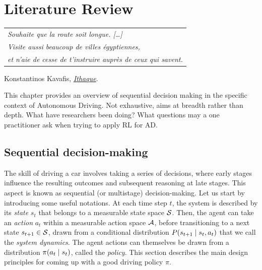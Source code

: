 
\graphicspath{{2-Chapters/2-Chapter/}}

\chapter{Literature Review}
\label{chapter:2}

\begin{flushright}
	\begin{tabular}{@{}l@{}}
		\emph{Souhaite que la route soit longue. [\dots]}\\
		\emph{Visite aussi beaucoup de villes égyptiennes,}\\
		\emph{et n’aie de cesse de t’instruire auprès de ceux qui savent.}\\
	\end{tabular}
	
	Konstantinos Kavafis, \href{https://eleurent.github.io/sisyphe/texts/ithaki.html}{\emph{Ithaque}}.
\end{flushright}

\abstractStartChapter{}%
This chapter provides an overview of sequential decision making in the specific context of Autonomous Driving. Not exhaustive, aims at breadth rather than depth. What have researchers been doing? What questions may a one practitioner ask when trying to apply RL for AD.
\minitocStartChapter{}

\section{Sequential decision-making}
\label{sec:sequential-decision-making}

The skill of driving a car involves taking a series of decisions, where early stages influence the resulting outcomes and subsequent reasoning at late stages. This aspect is known as sequential (or multistage) decision-making. Let us start by introducing some useful notations. At each time step $t$, the system is described by its \emph{state} $s_t$ that belongs to a measurable state space $\mathcal{S}$. Then, the agent can take an \emph{action} $a_t$ within a measurable action space $\mathcal{A}$, before transitioning to a next state $s_{t+1}\in\mathcal{S}$, drawn from a conditional distribution $P\lparen s_{t+1} \mid s_t, a_t\rparen$ that we call the \emph{system dynamics}. The agent actions can themselves be drawn from a distribution $\pi\lparen a_t\mid s_t\rparen$, called the \emph{policy}. This section describes the main design principles for coming up with a good driving policy $\pi$.

